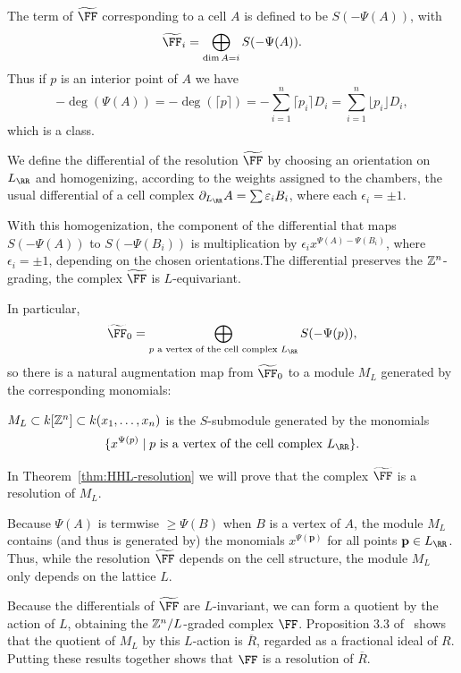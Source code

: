 \documentclass{amsart}
\begin{document}
\begin{defn}\label{def of F}
 The term of $\tF$ corresponding to a cell $A$ is defined to be $S(-\Psi(A))$, with  
 \[
    \tF_i=\bigoplus_{\dim A=i}S(-\Psi(A)).
   \]
Thus if $p$ is an interior point of $A$
we have
\[
-\deg(\Psi(A)) = -\deg( \lceil {p}\rceil) = -\sum_{i=1}^n\lceil p_i\rceil D_i=\sum_{i=1}^n\lfloor p_i\rfloor D_i,
\] 
which is a \BT class.

 We define the differential of the resolution $\tF$ by choosing
an orientation on $L_\RR$ and homogenizing, according to the weights assigned to the chambers, the usual differential of
a cell complex $\partial_{L_{\RR}}A = \sum\epsilon_{i}B_{i}$, where each $\epsilon_{i} = \pm 1$.
\end{defn}

With this homogenization, the component of the differential that maps $S(-\Psi(A))$ to $S(-\Psi(B_{i}))$ is multiplication by $\epsilon_{i}x^{\Psi(A) - \Psi(B_{i})}$, where
$\epsilon_{i} = \pm 1$, depending on the chosen orientations.The
differential preserves the $\mathbb Z^{n}$-grading, the complex $\tF$ is $L$-equivariant.



In particular,
$$
\tF_{0} = \bigoplus_{p \text{ a vertex of the cell complex }L_{\RR}}S(-\Psi(p)),
$$
so there is a natural augmentation map from $\tF_{0}$ to a module $M_{L}$ generated by the corresponding monomials:

\begin{defn}\label{def:M_{L}}
 $M_{L}\subset k[\mathbb Z^{n}]\subset k(x_{1}, \dots, x_{n})$ is the $S$-submodule generated by the monomials
 $$
 \{x^{\Psi(p)} \mid p \hbox{ is a vertex of the cell complex }L_{\RR}\}.
 $$
\end{defn}


In Theorem~\ref{thm:HHL-resolution} we will prove that the complex $\tF$ is a resolution of $M_L$.

\begin{remark}
 Because $\Psi(A)$ is termwise $\geq \Psi(B)$ when $B$ is a vertex of $A$, the module $M_{L}$ contains (and thus is generated by) the monomials $x^{\Psi(\mathbf{p})}$ for all points $\mathbf{p}\in L_{\RR}$. Thus, while the resolution $\tF$ depends on the cell structure, the module $M_L$ only depends on the lattice $L$.
\end{remark}

Because the differentials of $\tF$ are $L$-invariant, we can form a quotient by the action of $L$, obtaining the $\mathbb Z^{n}/L$-graded complex $\FF$. Proposition 3.3 of~\cite{BCS+25} shows  that the quotient of $M_L$ by this $L$-action is $\overline{R}$, regarded as a fractional ideal of $R$. Putting these results together shows that  $\FF$ is a resolution of $\overline R$.
\end{document}
